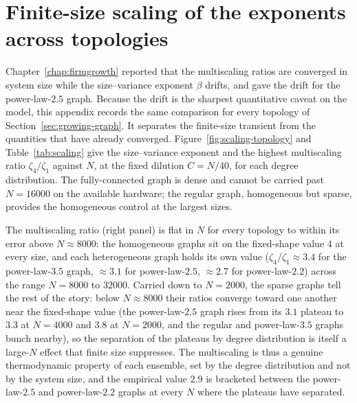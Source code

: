 \chapter{Finite-size scaling of the exponents across topologies}
\label{app:scaling}

Chapter~\ref{chap:firmgrowth} reported that the multiscaling ratios are converged in
system size while the size--variance exponent $\beta$ drifts, and gave the drift for the
power-law-$2.5$ graph. Because the drift is the sharpest quantitative caveat on the model, this
appendix records the same comparison for every topology of Section~\ref{sec:growing-graph}.
It separates the finite-size transient from the quantities that have already converged.
Figure~\ref{fig:scaling-topology} and Table~\ref{tab:scaling} give the size--variance exponent
and the highest multiscaling ratio $\zeta_4/\zeta_1$ against $N$, at the fixed dilution
$C = N/40$, for each degree distribution. The fully-connected graph is dense and cannot be
carried past $N = 16000$ on the available hardware; the regular graph, homogeneous but sparse,
provides the homogeneous control at the largest sizes.

The multiscaling ratio (right panel) is flat in $N$ for every
topology to within its error above $N \approx 8000$: the homogeneous graphs sit on the
fixed-shape value $4$ at every size, and each heterogeneous graph holds its own value
($\zeta_4/\zeta_1 \approx 3.4$ for the power-law-$3.5$ graph, $\approx 3.1$ for power-law-$2.5$,
$\approx 2.7$ for power-law-$2.2$) across the range $N = 8000$ to $32000$. Carried down to
$N = 2000$, the sparse graphs tell the rest of the story: below $N \approx 8000$ their ratios
converge toward one another near the fixed-shape value (the power-law-$2.5$ graph rises from its
$3.1$ plateau to $3.3$ at $N = 4000$ and $3.8$ at $N = 2000$, and the regular and power-law-$3.5$
graphs bunch nearby), so the separation of the plateaus by degree distribution is itself a
large-$N$ effect that finite size suppresses. The multiscaling is
thus a genuine thermodynamic property of each ensemble, set by the degree distribution and not
by the system size, and the empirical value $2.9$ is bracketed between the power-law-$2.5$ and
power-law-$2.2$ graphs at every $N$ where the plateaus have separated.

